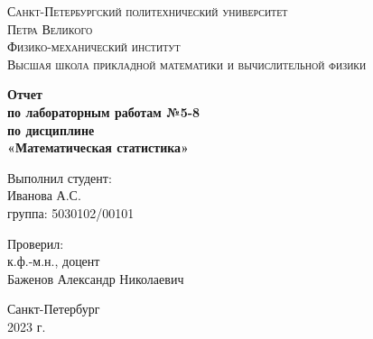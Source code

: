 \begin{titlepage}
	\begin{center}
		\textsc{Санкт-Петербургский политехнический университет\\Петра Великого\\[5mm]
			Физико-механический институт\\[2mm]
			Высшая школа прикладной математики и вычислительной физики}
		
		\vfill
		
		\textbf{Отчет\\по лабораторным работам №5-8\\по дисциплине\\ «Математическая статистика»
			\\[26mm]
		}
	\end{center}
	
	\begin{flushright}
		Выполнил студент: \\
		Иванова А.С. \\
		группа: 5030102/00101 \\
	\end{flushright}
	
	\begin{flushright}
		Проверил: \\
		к.ф.-м.н., доцент \\
		Баженов Александр Николаевич
	\end{flushright}
	
	\vspace*{\fill}
	\begin{center}
		Санкт-Петербург\\2023 г.
	\end{center}
\end{titlepage}